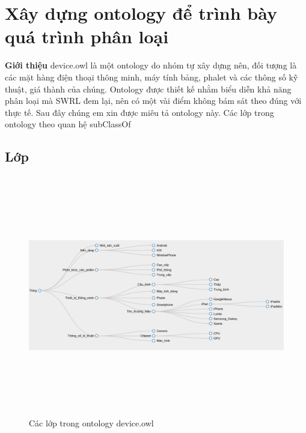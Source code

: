 {\section{Xây dựng ontology để trình bày quá trình phân loại}
\textbf{Giới thiệu} device.owl \cite{owleditorSrc} là một ontology do nhóm tự xây dựng nên, đối tượng là các mặt hàng điện thoại thông minh, máy tính bảng, phalet và các thông số kỹ thuật, giá thành của chúng. Ontology được thiết kế nhằm biểu diễn khả năng phân loại mà SWRL đem lại, nên có một vài điểm không bám sát theo đúng với thực tế. Sau đây chúng em xin được miêu tả ontology này.
Các lớp trong ontology theo quan hệ subClassOf
\subsection{Lớp}
\begin{figure}[h!]
	\centering
	\includegraphics[width=155mm,height=105mm]{Figures/transport_cls.png}
	\caption{Các lớp trong ontology device.owl\label{overflow}}
\end{figure}


}
